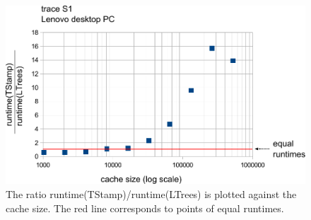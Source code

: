 \documentclass[a4paper,12pt, titlepage]{article}  %
\begin{document}
\begin{figure}[p]
	\centering
	\includegraphics[scale=0.8]{./experiments/lenovo_S1.pdf}
	\caption{The ratio runtime(TStamp)/runtime(LTrees) is plotted against the cache size.
                     The red line corresponds to points of equal runtimes.} 
	\label{fig:lenovo_S1}
\end{figure}
\end{document}
